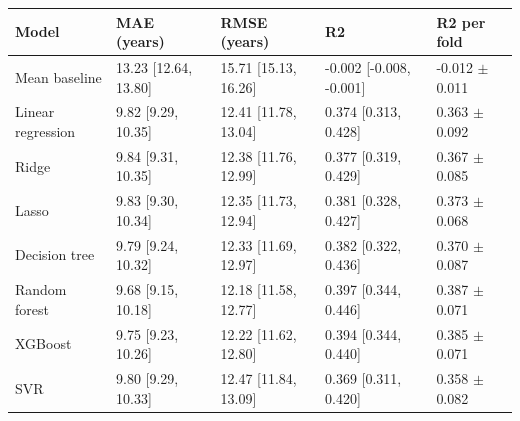 \begin{tabular}{lllll}
\toprule
\textbf{Model} & \textbf{MAE (years)} & \textbf{RMSE (years)} & \textbf{R2} & \textbf{R2 per fold} \\
\midrule
Mean baseline & 13.23 [12.64, 13.80] & 15.71 [15.13, 16.26] & -0.002 [-0.008, -0.001] & -0.012 $\pm$ 0.011 \\
Linear regression & 9.82 [9.29, 10.35] & 12.41 [11.78, 13.04] & 0.374 [0.313, 0.428] & 0.363 $\pm$ 0.092 \\
Ridge & 9.84 [9.31, 10.35] & 12.38 [11.76, 12.99] & 0.377 [0.319, 0.429] & 0.367 $\pm$ 0.085 \\
Lasso & 9.83 [9.30, 10.34] & 12.35 [11.73, 12.94] & 0.381 [0.328, 0.427] & 0.373 $\pm$ 0.068 \\
Decision tree & 9.79 [9.24, 10.32] & 12.33 [11.69, 12.97] & 0.382 [0.322, 0.436] & 0.370 $\pm$ 0.087 \\
Random forest & 9.68 [9.15, 10.18] & 12.18 [11.58, 12.77] & 0.397 [0.344, 0.446] & 0.387 $\pm$ 0.071 \\
XGBoost & 9.75 [9.23, 10.26] & 12.22 [11.62, 12.80] & 0.394 [0.344, 0.440] & 0.385 $\pm$ 0.071 \\
SVR & 9.80 [9.29, 10.33] & 12.47 [11.84, 13.09] & 0.369 [0.311, 0.420] & 0.358 $\pm$ 0.082 \\
\bottomrule
\end{tabular}
